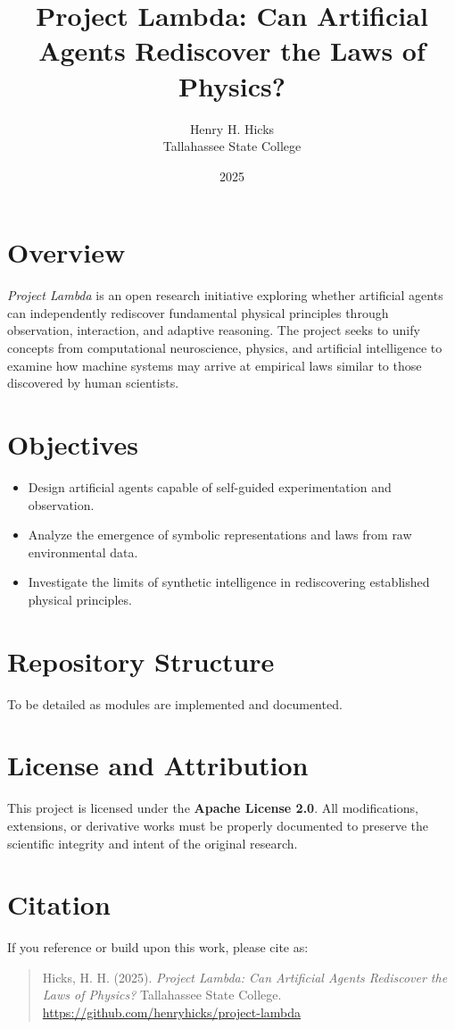 \documentclass[12pt]{article}
\title{\centering \textbf{Project Lambda: Can Artificial Agents Rediscover the Laws of Physics?}}
\author{Henry H. Hicks \\ Tallahassee State College}
\date{2025}
\begin{document}
\maketitle

\section*{Overview}
\textit{Project Lambda} is an open research initiative exploring whether artificial agents can independently rediscover fundamental physical principles through observation, interaction, and adaptive reasoning.
The project seeks to unify concepts from computational neuroscience, physics, and artificial intelligence to examine how machine systems may arrive at empirical laws similar to those discovered by human scientists.

\section*{Objectives}
\begin{itemize}
    \item Design artificial agents capable of self-guided experimentation and observation.
    \item Analyze the emergence of symbolic representations and laws from raw environmental data.
    \item Investigate the limits of synthetic intelligence in rediscovering established physical principles.
\end{itemize}

\section*{Repository Structure}
To be detailed as modules are implemented and documented.

\section*{License and Attribution}
This project is licensed under the \textbf{Apache License 2.0}.
All modifications, extensions, or derivative works must be properly documented to preserve the scientific integrity and intent of the original research.

\section*{Citation}
If you reference or build upon this work, please cite as:
\begin{quote}
Hicks, H. H. (2025). \textit{Project Lambda: Can Artificial Agents Rediscover the Laws of Physics?}
Tallahassee State College. \url{https://github.com/henryhicks/project-lambda}
\end{quote}
\end{document}

